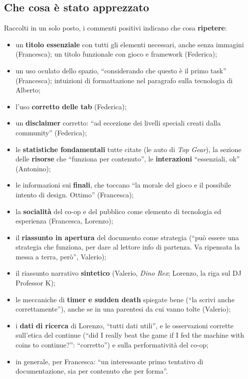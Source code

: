 \subsection{Che cosa è stato apprezzato}
\label{rv:t1:sec:apprezzato}

Raccolti in un solo posto, i commenti positivi indicano che cosa
\textbf{ripetere}:
\begin{itemize}
  \item un \textbf{titolo essenziale} con tutti gli elementi necessari, anche
        senza immagini (Francesca); un titolo funzionale con gioco e
        framework (Federica);
  \item un uso oculato dello spazio, ``considerando che questo è il primo
        task'' (Francesca); intuizioni di formattazione nel paragrafo sulla
        tecnologia di Alberto;
  \item l'uso \textbf{corretto delle tab} (Federica);
  \item un \textbf{disclaimer} corretto: ``ad eccezione dei livelli speciali
        creati dalla community'' (Federica);
  \item le \textbf{statistiche fondamentali} tutte citate (le auto di
        \emph{Top Gear}), la sezione delle \textbf{risorse} che ``funziona per
        contenuto'', le \textbf{interazioni} ``essenziali, ok'' (Antonino);
  \item le informazioni sui \textbf{finali}, che toccano ``la morale del
        gioco e il possibile intento di design. Ottimo'' (Francesca);
  \item la \textbf{socialità} del co-op e del pubblico come elemento di
        tecnologia ed esperienza (Francesca, Lorenzo);
  \item il \textbf{riassunto in apertura} del documento come strategia (``può
        essere una strategia che funziona, per dare al lettore info di
        partenza. Va ripensata la messa a terra, però'', Valerio);
  \item il riassunto narrativo \textbf{sintetico} (Valerio, \emph{Dino Rex};
        Lorenzo, la riga sul DJ Professor K);
  \item le meccaniche di \textbf{timer e sudden death} spiegate bene (``la
        scrivi anche correttamente''), anche se in una parentesi da cui vanno
        tolte (Valerio);
  \item i \textbf{dati di ricerca} di Lorenzo, ``tutti dati utili'', e le
        osservazioni corrette sull'etica del continue (``did I really beat the
        game if I fed the machine with coins to continue?'': ``corretto'') e
        sulla performatività del co-op;
  \item in generale, per Francesca: ``un interessante primo tentativo di
        documentazione, sia per contenuto che per forma''.
\end{itemize}

